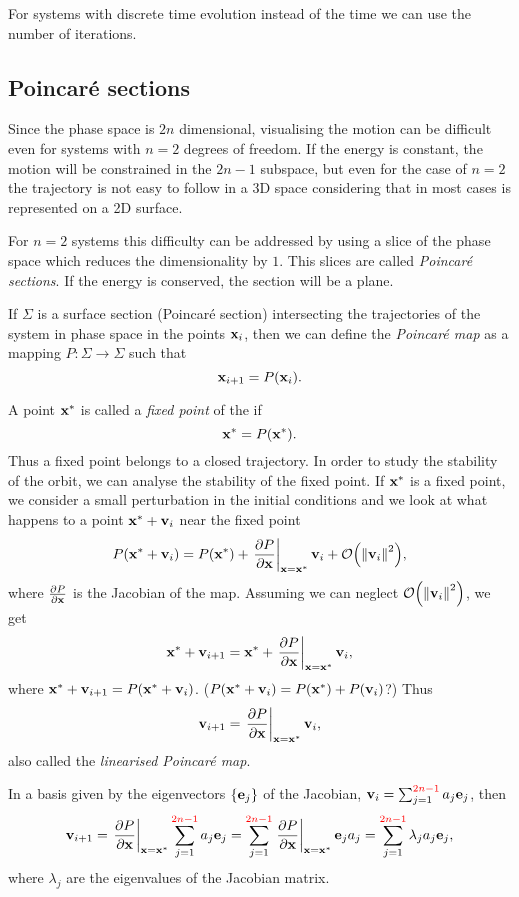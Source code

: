 \documentclass[../thesis.tex]{subfiles}
\theoremstyle{plain}
\begin{document}
For systems with discrete time evolution instead of the time we can use the number
of iterations.

\subsection{Poincaré sections}

Since the phase space is \(2n\) dimensional, visualising the motion can be
difficult even for systems with \(n=2\) degrees of freedom. If the energy is
constant, the motion will be constrained in the \(2n-1\) subspace, but even for
the case of \(n=2\) the trajectory is not easy to follow in a 3D space considering
that in most cases is represented on a 2D surface.

For \(n=2\) systems this difficulty can be addressed by using a slice of the phase
space which reduces the dimensionality by $1$. This slices are called
\emph{Poincaré sections}.
If the energy is conserved, the section will be a plane.

If \(\Sigma \) is a surface section{\color{red} (Poincaré section)} intersecting the
trajectories of the system in phase space in the points \(\vb{x}_i\), then we can
define the \emph{Poincaré map} as a mapping \({P:\Sigma \to \Sigma}\) such that
\[
  \vb{x}_{i+1} = P(\vb{x}_i).
\]

A point \(\vb{x}^*\) is called a \emph{fixed point} of the  if
\[
  \vb{x}^* = P(\vb{x}^*).
\]
Thus a fixed point belongs to a closed trajectory. In order to study the stability
of the orbit, we can analyse the stability of the fixed point.
If \(\vb{x}^*\) is a fixed point, we consider a small perturbation in the initial
conditions and we look at what happens to a point \(\vb{x}^* + \vb{v}_i\) near the fixed point
\[
  P(\vb{x}^* + \vb{v}_i) = P(\vb{x}^*) + \eval{\pdv{P}{\vb{x}}}_{\vb{x}=\vb{x}^*} \vb{v}_i + \order{\norm{\vb{v}_i}^2},
\]
where \(\pdv{P}{\vb{x}}\) is the Jacobian of the map.
Assuming we can neglect \(\order{\norm{\vb{v}_i}^2}\), we get
\[
  \vb{x}^* + \vb{v}_{i+1} = \vb{x}^* + \eval{\pdv{P}{\vb{x}}}_{\vb{x}=\vb{x}^*} \vb{v}_i,
\]
where \(\vb{x}^* + \vb{v}_{i+1} = P(\vb{x}^* + \vb{v}_i)\).{\color{red} (\(P(\vb{x}^* + \vb{v}_i) = P(\vb{x}^*) + P(\vb{v}_i)\)?)} Thus
\begin{equation}
  \label{eq:lin-map}
  \vb{v}_{i+1} = \eval{\pdv{P}{\vb{x}}}_{\vb{x}=\vb{x}^*} \vb{v}_i,
\end{equation}
{\color{red}also called the \emph{linearised Poincaré map}}.

In a basis given by the eigenvectors \( \{\vb{e}_j\} \) of the Jacobian,
\(\vb{v}_{i} = \sum_{j=1}^{{\color{red}2n-1}} a_j \vb{e}_j\), then
\[
  \vb{v}_{i+1} = \eval{\pdv{P}{\vb{x}}}_{\vb{x}=\vb{x}^*} \sum_{j=1}^{{\color{red}2n-1}} a_j \vb{e}_j
               = \sum_{j=1}^{{\color{red}2n-1}} \eval{\pdv{P}{\vb{x}}}_{\vb{x}=\vb{x}^*} \vb{e}_j a_j
               = \sum_{j=1}^{{\color{red}2n-1}} \lambda_j a_j \vb{e}_j,
\]
where \(\lambda_j\) are the eigenvalues of the Jacobian matrix.
\end{document}
